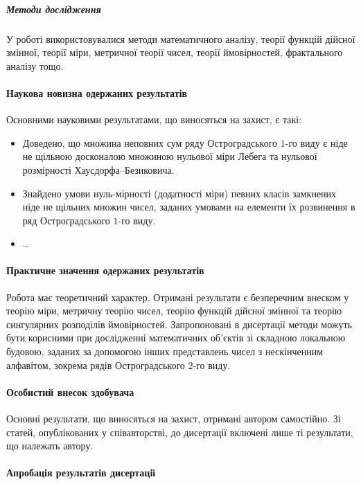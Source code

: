 \subparagraph{Методи дослідження}

У роботі використовувалися методи математичного аналізу, теорії
функцій дійсної змінної, теорії міри, метричної теорії чисел,
теорії ймовірностей, фрактального аналізу тощо.


\paragraph{Наукова новизна одержаних результатів}

Основними науковими результатами, що виносяться на захист, є такі:
\begin{itemize}
\item Доведено, що множина неповних сум ряду Остроградського
$1$-го виду є ніде не щільною досконалою множиною нульової міри
Лебега та нульової розмірності Хаусдорфа--Безиковича.

\item Знайдено умови нуль-мірності (додатності міри) певних класів
замкнених ніде не щільних множин чисел, заданих умовами на
елементи їх розвинення в ряд Остроградського $1$-го виду.

\item \ldots
\end{itemize}


\paragraph{Практичне значення одержаних результатів}

Робота має теоретичний характер. Отримані результати є безперечним
внеском у теорію міри, метричну теорію чисел, теорію функцій
дійсної змінної та теорію сингулярних розподілів ймовірностей.
Запропоновані в дисертації методи можуть бути корисними при
дослідженні математичних об'єктів зі складною локальною будовою,
заданих за допомогою інших представлень чисел з нескінченним
алфавітом, зокрема рядів Остроградського $2$-го виду.


\paragraph{Особистий внесок здобувача}

Основні результати, що виносяться на захист, отримані автором
самостійно. Зі статей, опублікованих у співавторстві, до
дисертації включені лише ті результати, що належать автору.


\paragraph{Апробація результатів дисертації}

